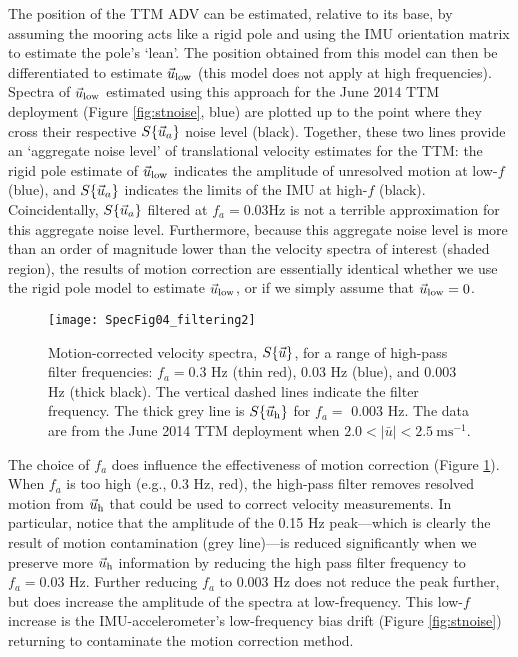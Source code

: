 The position of the TTM ADV can be estimated, relative to its base, by assuming the mooring acts like a rigid pole and using the IMU orientation matrix to estimate the pole's `lean'. The position obtained from this model can then be differentiated to estimate $\vec{u}_\mathrm{low}$ (this model does not apply at high frequencies). Spectra of $\vec{u}_\mathrm{low}$ estimated using this approach for the June 2014 TTM deployment (Figure \ref{fig:stnoise}, blue) are plotted up to the point where they cross their respective $S\{\vec{u}_a\}$ noise level (black).  Together, these two lines provide an `aggregate noise level' of translational velocity estimates for the TTM: the rigid pole estimate of $\vec{u}_\mathrm{low}$ indicates the amplitude of unresolved motion at low-$f$ (blue), and $S\{\vec{u}_a\}$ indicates the limits of the IMU at high-$f$ (black). Coincidentally, $S\{\vec{u}_a\}$ filtered at $f_a = 0.03$Hz is not a terrible approximation for this aggregate noise level. Furthermore, because this aggregate noise level is more than an order of magnitude lower than the velocity spectra of interest (shaded region), the results of motion correction are essentially identical whether we use the rigid pole model to estimate $\vec{u}_\mathrm{low}$, or if we simply assume that $\vec{u}_\mathrm{low} = 0$. 


\begin{figure}[t]
  \centering
  \texttt{[image: SpecFig04\_filtering2]}
  \caption{Motion-corrected velocity spectra, $S\{\vec{u}\}$, for a range of high-pass filter frequencies: $f_a= 0.3$ Hz (thin red), 0.03 Hz (blue), and 0.003 Hz (thick black). The vertical dashed lines indicate the filter frequency. The thick grey line is $S\{\vec{u}_\mathrm{h}\}$ for $f_a=$ 0.003 Hz. The data are from the June 2014 TTM deployment when $2.0 < |\bar{u}| < 2.5\ \mathrm{ms^{-1}}$.
}
  \label{fig:filts}
\end{figure}

The choice of $f_a$ does influence the effectiveness of motion correction (Figure \ref{fig:filts}). When $f_a$ is too high (e.g., 0.3  Hz, red), the high-pass filter removes resolved motion from $\vec{u}_\mathrm{h}$ that could be used to correct velocity measurements. In particular, notice that the amplitude of the 0.15 Hz peak---which is clearly the result of motion contamination (grey line)---is reduced significantly when we preserve more $\vec{u}_\mathrm{h}$ information by reducing the high pass filter frequency to $f_a = 0.03$ Hz. Further reducing $f_a$ to $0.003$ Hz does not reduce the peak further, but does increase the amplitude of the spectra at low-frequency. This low-$f$ increase is the IMU-accelerometer's low-frequency bias drift (Figure \ref{fig:stnoise}) returning to contaminate the motion correction method.

